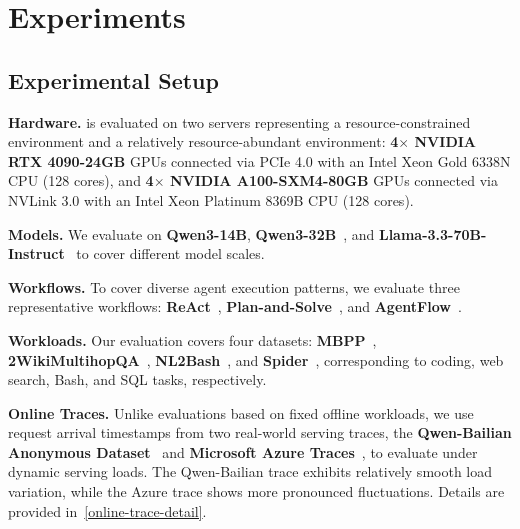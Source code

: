 
\section{Experiments}

\subsection{Experimental Setup}

\textbf{Hardware.}
\sysname is evaluated on two servers representing a resource-constrained environment and a relatively resource-abundant environment: \textbf{4$\times$ NVIDIA RTX 4090-24GB} GPUs connected via PCIe 4.0 with an Intel Xeon Gold 6338N CPU (128 cores),
and \textbf{4$\times$ NVIDIA A100-SXM4-80GB} GPUs connected via NVLink 3.0 with an Intel Xeon Platinum 8369B CPU (128 cores).

\textbf{Models.}
We evaluate \sysname on \textbf{Qwen3-14B}, \textbf{Qwen3-32B}~\citep{qwen3}, and \textbf{Llama-3.3-70B-Instruct}~\citep{llama3} to cover different model scales.

\textbf{Workflows.}
To cover diverse agent execution patterns, we evaluate three representative workflows: \textbf{ReAct}~\citep{ReAct}, \textbf{Plan-and-Solve}~\citep{Plan-and-Solve}, and \textbf{AgentFlow}~\citep{AgentFlow}.

\textbf{Workloads.}
Our evaluation covers four datasets: \textbf{MBPP}~\citep{MBPP}, \textbf{2WikiMultihopQA}~\citep{2wiki}, \textbf{NL2Bash}~\citep{nl2bash}, and \textbf{Spider}~\citep{spider}, corresponding to coding, web search, Bash, and SQL tasks, respectively.

\textbf{Online Traces.}
\label{Traces}
Unlike evaluations based on fixed offline workloads, we use request arrival timestamps from two real-world serving traces, the \textbf{Qwen-Bailian Anonymous Dataset}~\citep{qwen-bailian} and \textbf{Microsoft Azure Traces}~\citep{azure}, to evaluate \sysname under dynamic serving loads. 
The Qwen-Bailian trace exhibits relatively smooth load variation, while the Azure trace shows more pronounced fluctuations. 
Details are provided in~\autoref{online-trace-detail}.

